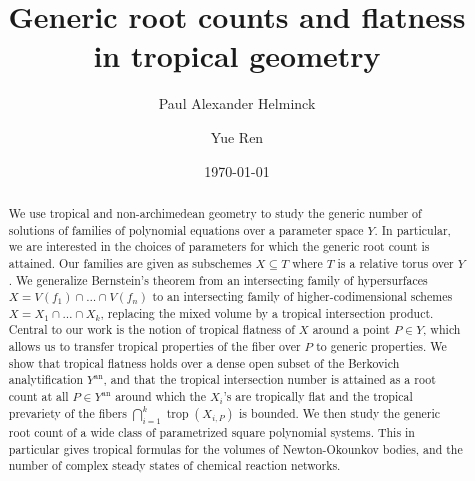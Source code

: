 \documentclass[12pt,reqno,a4paper]{amsart}
\theoremstyle{theoremstyle}
\theoremstyle{examplestyle}
\theoremstyle{algorithmstyle}
\newcommand{\an}{{\mathrm{an}}}
\DeclareMathOperator{\Trop}{trop}
\begin{document}
\title[Generic root counts and flatness in tropical geometry]{Generic root counts and flatness\\ in tropical geometry} %
%


\author{Paul Alexander Helminck}
\address{Mathematical Institute, Tohoku University, Japan.
}
\author{Yue Ren}
\address{Department of Mathematics, Durham University, United Kingdom.}


\date{\today}


\begin{abstract}
  We use tropical and non-archimedean geometry to study the generic number of solutions of families of polynomial equations over a parameter space $Y$. In particular, we are interested in the choices of parameters for which the generic root count is attained.
  Our families are given as subschemes $X\subseteq T$ where $T$ is a relative torus over $Y$.
  We generalize Bernstein's theorem from an intersecting family of hypersurfaces $X=V(f_1)\cap\dots\cap V(f_n)$ to an intersecting family of higher-codimensional schemes $X=X_1\cap\dots\cap X_k$, replacing the mixed volume by a tropical intersection product.
  Central to our work is the notion of tropical flatness of $X$ around a point $P\in Y$, which allows us to transfer tropical properties of the  fiber over $P$ to generic properties.  We show that tropical flatness holds over a dense open subset of the Berkovich analytification $Y^\an$, and that the tropical intersection number is attained as a root count at all $P\in Y^\an$ around which the $X_i$'s are tropically flat and the tropical prevariety of the fibers $\bigcap_{i=1}^k\Trop(X_{i,P})$ is bounded.
  We then study the generic root count of a wide class of parametrized square polynomial systems. This in particular gives tropical formulas for the volumes of Newton-Okounkov bodies, and the number of complex steady states of chemical reaction networks.
\end{abstract}

\maketitle
\end{document}
